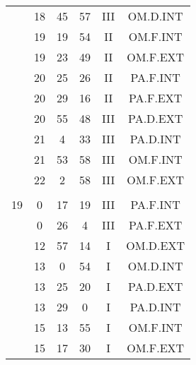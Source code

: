 \documentclass[12pt, a4paper]{article}
\begin{document}
\begin{multicols}{3}
{\begin{tabular}{c c c c c c}
	 	 	 	 & 18 & 45 & 57 & III & OM.D.INT\\%
	 	 	 	 & 19 & 19 & 54 & II & OM.F.INT\\%
	 	 	 	 & 19 & 23 & 49 & II & OM.F.EXT\\%
	 	 	 	 & 20 & 25 & 26 & II & PA.F.INT\\%
	 	 	 	 & 20 & 29 & 16 & II & PA.F.EXT\\%
	 	 	 	 & 20 & 55 & 48 & III & PA.D.EXT\\%
	 	 	 	 & 21 & 4 & 33 & III & PA.D.INT\\%
	 	 	 	 & 21 & 53 & 58 & III & OM.F.INT\\%
	 	 	 	 & 22 & 2 & 58 & III & OM.F.EXT\\%
	 	 	 	 & & & & & \\%
	 	 	 	19 & 0 & 17 & 19 & III & PA.F.INT\\%
	 	 	 	 & 0 & 26 & 4 & III & PA.F.EXT\\%
	 	 	 	 & 12 & 57 & 14 & I & OM.D.EXT\\%
	 	 	 	 & 13 & 0 & 54 & I & OM.D.INT\\%
	 	 	 	 & 13 & 25 & 20 & I & PA.D.EXT\\%
	 	 	 	 & 13 & 29 & 0 & I & PA.D.INT\\%
	 	 	 	 & 15 & 13 & 55 & I & OM.F.INT\\%
	 	 	 	 & 15 & 17 & 30 & I & OM.F.EXT\\%
	 	 \end{tabular}
 	}
\end{multicols}
\end{document}

